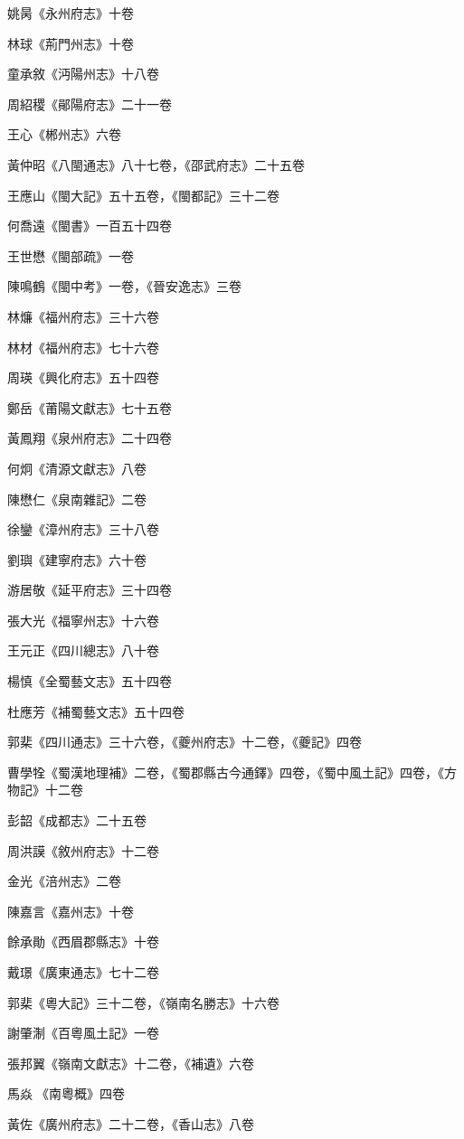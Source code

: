 姚昺《永州府志》十卷

林球《荊門州志》十卷

童承敘《沔陽州志》十八卷

周紹稷《鄖陽府志》二十一卷

王心《郴州志》六卷

黃仲昭《八閩通志》八十七卷，《邵武府志》二十五卷

王應山《閩大記》五十五卷，《閩都記》三十二卷

何喬遠《閩書》一百五十四卷

王世懋《閩部疏》一卷

陳鳴鶴《閩中考》一卷，《晉安逸志》三卷

林燫《福州府志》三十六卷

林材《福州府志》七十六卷

周瑛《興化府志》五十四卷

鄭岳《莆陽文獻志》七十五卷

黃鳳翔《泉州府志》二十四卷

何炯《清源文獻志》八卷

陳懋仁《泉南雜記》二卷

徐鑾《漳州府志》三十八卷

劉璵《建寧府志》六十卷

游居敬《延平府志》三十四卷

張大光《福寧州志》十六卷

王元正《四川總志》八十卷

楊慎《全蜀藝文志》五十四卷

杜應芳《補蜀藝文志》五十四卷

郭棐《四川通志》三十六卷，《夔州府志》十二卷，《夔記》四卷

曹學牷《蜀漢地理補》二卷，《蜀郡縣古今通鐸》四卷，《蜀中風土記》四卷，《方物記》十二卷

彭韶《成都志》二十五卷

周洪謨《敘州府志》十二卷

金光《涪州志》二卷

陳嘉言《嘉州志》十卷

餘承勛《西眉郡縣志》十卷

戴璟《廣東通志》七十二卷

郭棐《粵大記》三十二卷，《嶺南名勝志》十六卷

謝肇淛《百粵風土記》一卷

張邦翼《嶺南文獻志》十二卷，《補遺》六卷

馬焱《南粵概》四卷

黃佐《廣州府志》二十二卷，《香山志》八卷

